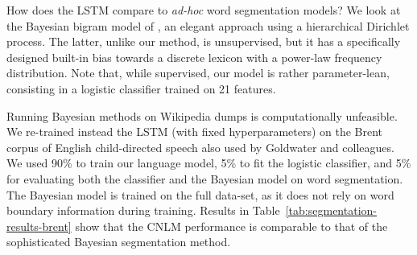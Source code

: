How does the LSTM compare to \emph{ad-hoc} word segmentation models?
We look at the Bayesian bigram model of
, an elegant approach using a
hierarchical Dirichlet process.  The latter, unlike our method, is
unsupervised, but it has a specifically designed built-in bias towards
a discrete lexicon with a power-law frequency distribution. Note that,
while supervised, our model is rather parameter-lean, consisting in a
logistic classifier trained on 21 features.

Running Bayesian methods on Wikipedia dumps is computationally
unfeasible. We re-trained instead the LSTM (with fixed
hyperparameters) on the Brent corpus of English child-directed speech
\cite{brent-efficient-1999} also used by Goldwater and colleagues.  We
used 90\% to train our language model, 5\% to fit the logistic
classifier, and 5\% for evaluating both the classifier and the Bayesian model on word segmentation.
The Bayesian
model is trained %
on the full data-set, as it does not
rely on word boundary information during training. Results in
Table~\ref{tab:segmentation-results-brent} show that the CNLM
performance is comparable to that of the sophisticated Bayesian
segmentation method.



